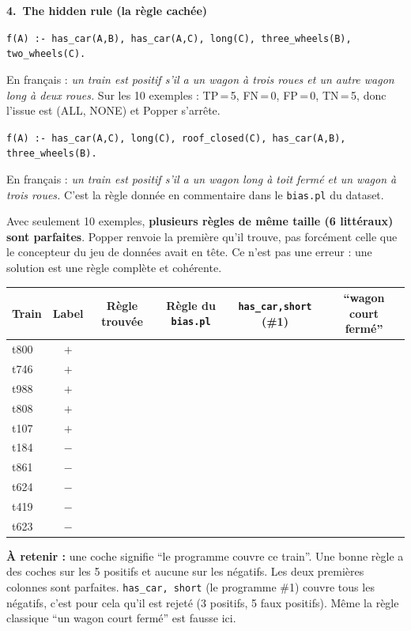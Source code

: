 \documentclass[10pt]{article}
\newcommand{\titrebox}[2]{\needspace{10\baselineskip}\vspace{8pt}
  \begin{tcolorbox}[colback=marine, colframe=marine, arc=0pt, boxrule=0pt,
    top=4pt, bottom=4pt, left=8pt]
  \color{white}\Large\bfseries #1.~#2
  \end{tcolorbox}\vspace{2pt}}
\newcommand{\ce}[1]{\begin{pourquoi}\textbf{\textcolor{marine}{À retenir :}} #1\end{pourquoi}}
\newcommand{\st}[1]{\par\needspace{7\baselineskip}\vspace{5pt}{\normalsize\bfseries\textcolor{marine}{#1}}\par\vspace{2pt}}
\begin{document}
\titrebox{4}{The hidden rule (la règle cachée)}
\st{Ce que Popper trouve (tour 48)}
\begin{moi}
\texttt{f(A) :- has\_car(A,B), has\_car(A,C), long(C), three\_wheels(B), two\_wheels(C).}
\end{moi}
En français : \emph{un train est positif s'il a un wagon à trois roues et un autre wagon long à deux roues.}
Sur les 10 exemples : TP\,=\,5, FN\,=\,0, FP\,=\,0, TN\,=\,5, donc l'issue est (ALL, NONE) et Popper s'arrête.

\st{Une autre règle parfaite sur ces 10 trains}
\begin{moi}
\texttt{f(A) :- has\_car(A,C), long(C), roof\_closed(C), has\_car(A,B), three\_wheels(B).}
\end{moi}
En français : \emph{un train est positif s'il a un wagon long à toit fermé et un wagon à trois roues.} C'est la règle donnée en commentaire dans le \texttt{bias.pl} du dataset.
\begin{piege}
Avec seulement 10 exemples, \textbf{plusieurs règles de même taille (6 littéraux) sont parfaites}. Popper renvoie la première qu'il trouve, pas forcément celle que le concepteur du jeu de données avait en tête. Ce n'est pas une erreur : une solution est une règle complète et cohérente.
\end{piege}

\st{Vérification train par train}
\def\ok{\textcolor{vert}{\ding{51}}}\def\ko{\textcolor{rouge}{\ding{55}}}
\renewcommand{\arraystretch}{1.2}
\begin{tabular}{@{}l c c c c c@{}}
\textbf{Train} & \textbf{Label} & \textbf{Règle trouvée} & \textbf{Règle du \texttt{bias.pl}} & \texttt{has\_car,short} (\#1) & ``wagon court fermé''\\\hline
t800 & $+$ & \ok & \ok & \ok & \ok\\
t746 & $+$ & \ok & \ok & \ok & \ok\\
t988 & $+$ & \ok & \ok & \ok & \ok\\
t808 & $+$ & \ok & \ok & \ko & \ko\\
t107 & $+$ & \ok & \ok & \ko & \ko\\\hline
t184 & $-$ & \ko & \ko & \ok & \ok\\
t861 & $-$ & \ko & \ko & \ok & \ko\\
t624 & $-$ & \ko & \ko & \ok & \ok\\
t419 & $-$ & \ko & \ko & \ok & \ok\\
t623 & $-$ & \ko & \ko & \ok & \ok\\
\end{tabular}
\ce{une coche signifie ``le programme couvre ce train''. Une bonne règle a des coches sur les 5 positifs et aucune sur les négatifs. Les deux premières colonnes sont parfaites. \texttt{has\_car, short} (le programme \#1) couvre tous les négatifs, c'est pour cela qu'il est rejeté (3 positifs, 5 faux positifs). Même la règle classique ``un wagon court fermé'' est fausse ici.}
\end{document}
